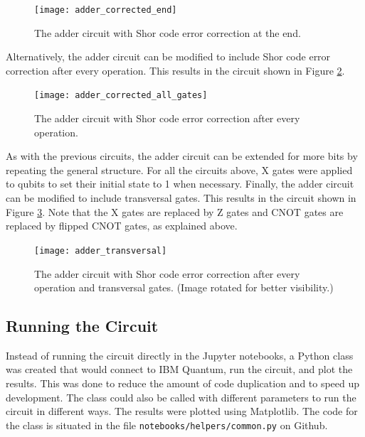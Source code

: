 \documentclass[letterpaper]{article}
\begin{document}
\begin{figure}[H]
    \centering
    \texttt{[image: adder\_corrected\_end]}
    \caption{The adder circuit with Shor code error correction at the end.}
    \label{fig:adder-corrected-end}
\end{figure}

Alternatively, the adder circuit can be modified to include Shor code error correction after every operation. This results in the circuit shown in Figure \ref{fig:adder-corrected-all-gates}.

\begin{figure}[H]
    \centering
    \texttt{[image: adder\_corrected\_all\_gates]}
    \caption{The adder circuit with Shor code error correction after every operation.}
    \label{fig:adder-corrected-all-gates}
\end{figure}

As with the previous circuits, the adder circuit can be extended for more bits by repeating the general structure. For all the circuits above, X gates were applied to qubits to set their initial state to 1 when necessary. Finally, the adder circuit can be modified to include transversal gates. This results in the circuit shown in Figure \ref{fig:adder-transversal}. Note that the X gates are replaced by Z gates and CNOT gates are replaced by flipped CNOT gates, as explained above.

\begin{figure}[H]
    \centering
    \texttt{[image: adder\_transversal]}
    \caption{The adder circuit with Shor code error correction after every operation and transversal gates. (Image rotated for better visibility.)}
    \label{fig:adder-transversal}
\end{figure}

\subsection{Running the Circuit}

Instead of running the circuit directly in the Jupyter notebooks, a Python class was created that would connect to IBM Quantum, run the circuit, and plot the results. This was done to reduce the amount of code duplication and to speed up development. The class could also be called with different parameters to run the circuit in different ways. The results were plotted using Matplotlib. The code for the class is situated in the file \texttt{notebooks/helpers/common.py} on Github.
\end{document}
